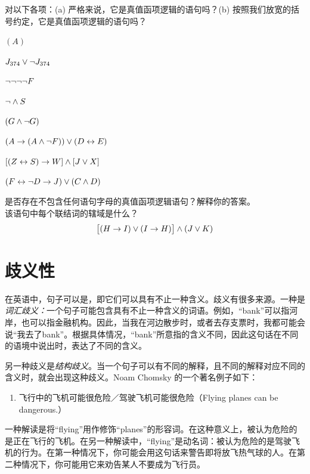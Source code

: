\solutions
\problempart
\label{pr.wiffTFL}
对以下各项：(a) 严格来说，它是真值函项逻辑的语句吗？(b) 按照我们放宽的括号约定，它是真值函项逻辑的语句吗？


\begin{compactlist}
\item $(A)$
\item $J_{374} \vee \neg J_{374}$
\item $\neg \neg \neg \neg F$
\item $\neg \wedge S$
\item $(G \wedge \neg G)$
\item $(A \rightarrow (A \wedge \neg F)) \vee (D \leftrightarrow E)$
\item $[(Z \leftrightarrow S) \rightarrow W] \wedge [J \vee X]$
\item $(F \leftrightarrow \neg D \rightarrow J) \vee (C \wedge D)$
\end{compactlist}

\problempart
是否存在不包含任何语句字母的真值函项逻辑语句？解释你的答案。\\

\problempart
该语句中每个联结词的辖域是什么？
$$\bigl[(H \rightarrow I) \vee (I \rightarrow H)\bigr] \wedge (J \vee K)$$

\chapter{歧义性}\label{s:AmbiguityTFL}

在英语中，句子可以是，即它们可以具有不止一种含义。歧义有很多来源。一种是\emph{词汇歧义：}一个句子可能包含具有不止一种含义的词语。例如，“bank”可以指河岸，也可以指金融机构。因此，当我在河边散步时，或者去存支票时，我都可能会说“我去了bank”。根据具体情况，“bank”所意指的含义不同，因此这句话在不同的语境中说出时，表达了不同的含义。

另一种歧义是\emph{结构歧义}。当一个句子可以有不同的解释，且不同的解释对应不同的含义时，就会出现这种歧义。Noam Chomsky 的一个著名例子如下：

\begin{enumerate}
	\item[] 飞行中的飞机可能很危险／驾驶飞机可能很危险（Flying planes can be dangerous.）
\end{enumerate}

一种解读是将“flying”用作修饰“planes”的形容词。在这种意义上，被认为危险的是正在飞行的飞机。在另一种解读中，“flying”是动名词：被认为危险的是驾驶飞机的行为。在第一种情况下，你可能会用这句话来警告即将放飞热气球的人。在第二种情况下，你可能用它来劝告某人不要成为飞行员。

